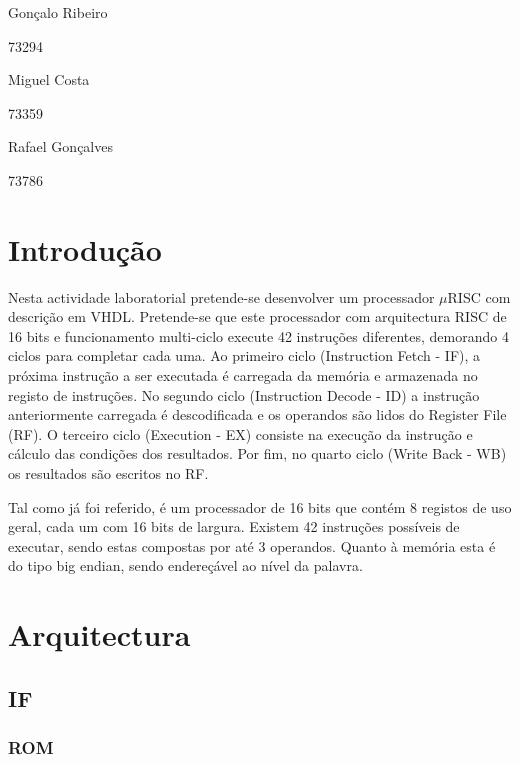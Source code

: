 \documentclass[a4paper]{article}
\begin{document}
	
	
	
	\trSetAuthors
		{
		Gonçalo Ribeiro
		
		73294
		}{
		Miguel Costa
		
		73359
		}{
		Rafael Gonçalves
		
		73786
		}
	
	
	\trMakeCover
	
	\tableofcontents
	\pagebreak
	
	\section{Introdução}
	
		Nesta actividade laboratorial pretende-se desenvolver um processador $\mu$RISC com descrição em VHDL. Pretende-se que este processador com arquitectura RISC de 16 bits e funcionamento multi-ciclo execute 42 instruções diferentes, demorando 4 ciclos para completar cada uma. Ao primeiro ciclo (Instruction Fetch - IF), a próxima instrução a ser executada é carregada da memória e armazenada no registo de instruções. No segundo ciclo (Instruction Decode - ID) a instrução anteriormente carregada é descodificada e os operandos são lidos do Register File (RF). O terceiro ciclo (Execution - EX) consiste na execução da instrução e cálculo das condições dos resultados. Por fim, no quarto ciclo (Write Back - WB) os resultados são escritos no RF.
	
		Tal como já foi referido, é um processador de 16 bits que contém 8 registos de uso geral, cada um com 16 bits de largura. Existem 42 instruções possíveis de executar, sendo estas compostas por até 3 operandos. Quanto à memória esta é do tipo big endian, sendo endereçável ao nível da palavra.
	
	
	\section{Arquitectura}
	
		\subsection{IF}
		
			\subsubsection{ROM}
			
\end{document}

